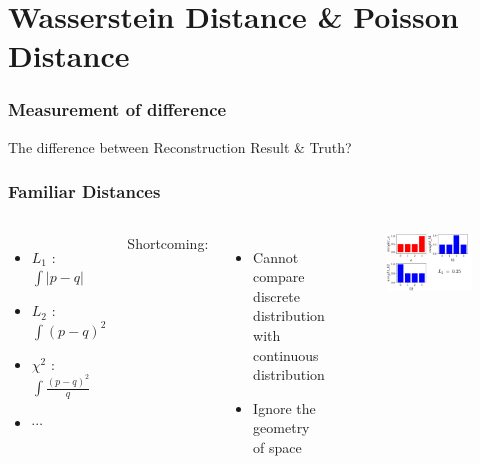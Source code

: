 \documentclass{beamer}
\begin{document}
\section{Wasserstein Distance \& Poisson Distance}
\begin{frame}
\frametitle{Measurement of difference}
\begin{center}
    The difference between Reconstruction Result \& Truth?
\end{center}
\end{frame}

\begin{frame}
\frametitle{Familiar Distances}
\begin{columns}
\begin{itemize}
    \item $L_{1}$ : $\int|p-q|$
    \item $L_{2}$ : $\int(p-q)^{2}$
    \item $\chi^{2}$ : $\int\frac{(p-q)^{2}}{q}$
    \item $\cdots$
\end{itemize}
Shortcoming:
\begin{itemize}
    \item Cannot compare discrete distribution with continuous distribution
    \item Ignore the geometry of space
\end{itemize}
\begin{figure}
    \centering
    \includegraphics[width=1.0\linewidth]{img/tab.png}
\end{figure}
\end{columns}
\end{frame}
\end{document}
